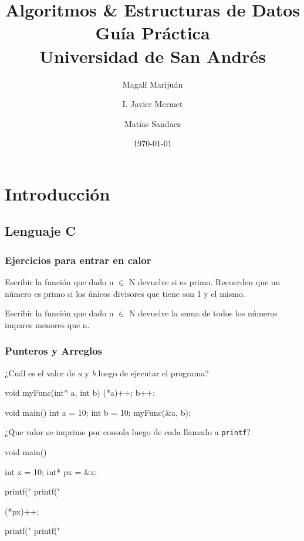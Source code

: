 \documentclass[titlepage,oneside]{book}
\title{
	Algoritmos \& Estructuras de Datos\\
	\large Guía Práctica \\
	\large Universidad de San Andrés
}
\author{Magalí Marijuán\\
	\and
	I. Javier Mermet
	\and
	Matías Sandacz
}
\date{\today}
\begin{document}
\maketitle
\tableofcontents

\part{Introducción}
\chapter{Lenguaje C}

\section{Ejercicios para entrar en calor}
\begin{Exercise}
Escribir la función que dado n $\in$ N devuelve si es primo. Recuerden que un número es primo si los únicos divisores que tiene son 1 y el mismo.
\end{Exercise}

\begin{Exercise}
Escribir la función que dado n $\in$ N devuelve la suma de todos los números impares menores que n.
\end{Exercise}

\section{Punteros y Arreglos}

\begin{Exercise} ¿Cuál es el valor de \textit{a} y \textit{b} luego de ejecutar el programa?
	\newline
	\begin{ccode}
	    void myFunc(int* a, int b)
	    {
	    (*a)++;
	    b++;
	    }

	    void main()
	    {
	        int a = 10;
	        int b = 10;
	        myFunc(&a, b);
	    }
	\end{ccode}
\end{Exercise}

\begin{Exercise} ¿Que valor se imprime por consola luego de cada llamado a \texttt{printf}?
	\newline
    \begin{ccode}
        void main()
        {
           int x = 10;
           int* px = &x;

           printf("%
           printf("%

           (*px)++;

           printf("%
           printf("%
        }
    \end{ccode}
\end{Exercise}
\end{document}

